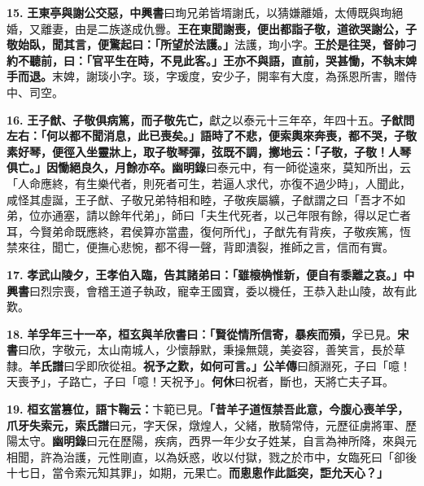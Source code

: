 \textbf{15.} \textbf{王東亭與謝公交惡，}{\footnotesize \textbf{中興書}曰珣兄弟皆壻謝氏，以猜嫌離婚，太傅既與珣絕婚，又離妻，由是二族遂成仇釁。}\textbf{王在東聞謝喪，便出都詣子敬，道欲哭謝公，子敬始臥，聞其言，便驚起曰：「所望於法護。」}{\footnotesize 法護，珣小字。}\textbf{王於是往哭，督帥刁約不聽前，曰：「官平生在時，不見此客。」王亦不與語，直前，哭甚慟，不執末婢手而退。}{\footnotesize 末婢，謝琰小字。琰，字瑗度，安少子，開率有大度，為孫恩所害，贈侍中、司空。}

\textbf{16.} \textbf{王子猷、子敬俱病篤，而子敬先亡，}{\footnotesize 獻之以泰元十三年卒，年四十五。}\textbf{子猷問左右：「何以都不聞消息，此已喪矣。」語時了不悲，便索輿來奔喪，都不哭，子敬素好琴，便徑入坐靈牀上，取子敬琴彈，弦既不調，擲地云：「子敬，子敬！人琴俱亡。」因慟絕良久，月餘亦卒。}{\footnotesize \textbf{幽明錄}曰泰元中，有一師從遠來，莫知所出，云「人命應終，有生樂代者，則死者可生，若逼人求代，亦復不過少時」，人聞此，咸怪其虛誕，王子猷、子敬兄弟特相和睦，子敬疾屬纊，子猷謂之曰「吾才不如弟，位亦通塞，請以餘年代弟」，師曰「夫生代死者，以己年限有餘，得以足亡者耳，今賢弟命既應終，君侯算亦當盡，復何所代」，子猷先有背疾，子敬疾篤，恆禁來往，聞亡，便撫心悲惋，都不得一聲，背即潰裂，推師之言，信而有實。}

\textbf{17.} \textbf{孝武山陵夕，王孝伯入臨，告其諸弟曰：「雖榱桷惟新，便自有黍離之哀。」}{\footnotesize \textbf{中興書}曰烈宗喪，會稽王道子執政，寵幸王國寶，委以機任，王恭入赴山陵，故有此歎。}

\textbf{18.} \textbf{羊孚年三十一卒，桓玄與羊欣書曰：「賢從情所信寄，暴疾而殞，}{\footnotesize 孚已見。\textbf{宋書}曰欣，字敬元，太山南城人，少懷靜默，秉操無競，美姿容，善笑言，長於草隸。\textbf{羊氏譜}曰孚即欣從祖。}\textbf{祝予之歎，如何可言。」}{\footnotesize \textbf{公羊傳}曰顏淵死，子曰「噫！天喪予」，子路亡，子曰「噫！天祝予」。\textbf{何休}曰祝者，斷也，天將亡夫子耳。}

\textbf{19.} \textbf{桓玄當篡位，語卞鞠云：}{\footnotesize 卞範已見。}\textbf{「昔羊子道恆禁吾此意，今腹心喪羊孚，爪牙失索元，}{\footnotesize \textbf{索氏譜}曰元，字天保，燉煌人，父緒，散騎常侍，元歷征虜將軍、歷陽太守。\textbf{幽明錄}曰元在歷陽，疾病，西界一年少女子姓某，自言為神所降，來與元相聞，許為治護，元性剛直，以為妖惑，收以付獄，戮之於市中，女臨死曰「卻後十七日，當令索元知其罪」，如期，元果亡。}\textbf{而悤悤作此詆突，詎允天心？」}